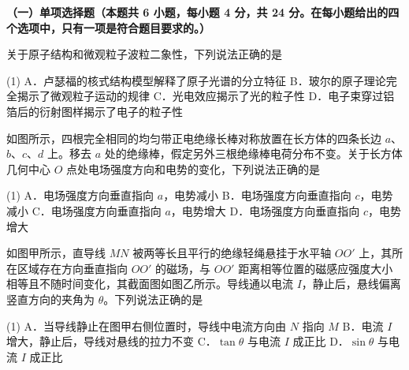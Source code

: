 

\textbf{（一）单项选择题（本题共 6 小题，每小题 4 分，共 24 分。在每小题给出的四个选项中，只有一项是符合题目要求的。）}

\begin{question}
关于原子结构和微观粒子波粒二象性，下列说法正确的是\gkblank

\begin{gkopts}(1)
  \task A．卢瑟福的核式结构模型解释了原子光谱的分立特征
  \task B．玻尔的原子理论完全揭示了微观粒子运动的规律
  \task C．光电效应揭示了光的粒子性
  \task D．电子束穿过铝箔后的衍射图样揭示了电子的粒子性
\end{gkopts}
\end{question}

\begin{question}
如图所示，四根完全相同的均匀带正电绝缘长棒对称放置在长方体的四条长边 $a$、$b$、$c$、$d$ 上。移去 $a$ 处的绝缘棒，假定另外三根绝缘棒电荷分布不变。关于长方体几何中心 $O$ 点处电场强度方向和电势的变化，下列说法正确的是\gkblank


\begin{gkopts}(1)
  \task A．电场强度方向垂直指向 $a$，电势减小
  \task B．电场强度方向垂直指向 $c$，电势减小
  \task C．电场强度方向垂直指向 $a$，电势增大
  \task D．电场强度方向垂直指向 $c$，电势增大
\end{gkopts}
\end{question}

\begin{question}
如图甲所示，直导线 $MN$ 被两等长且平行的绝缘轻绳悬挂于水平轴 $OO'$ 上，其所在区域存在方向垂直指向 $OO'$ 的磁场，与 $OO'$ 距离相等位置的磁感应强度大小相等且不随时间变化，其截面图如图乙所示。导线通以电流 $I$，静止后，悬线偏离竖直方向的夹角为 $\theta$。下列说法正确的是\gkblank


\begin{gkopts}(1)
  \task A．当导线静止在图甲右侧位置时，导线中电流方向由 $N$ 指向 $M$
  \task B．电流 $I$ 增大，静止后，导线对悬线的拉力不变
  \task C．$\tan\theta$ 与电流 $I$ 成正比
  \task D．$\sin\theta$ 与电流 $I$ 成正比
\end{gkopts}
\end{question}

